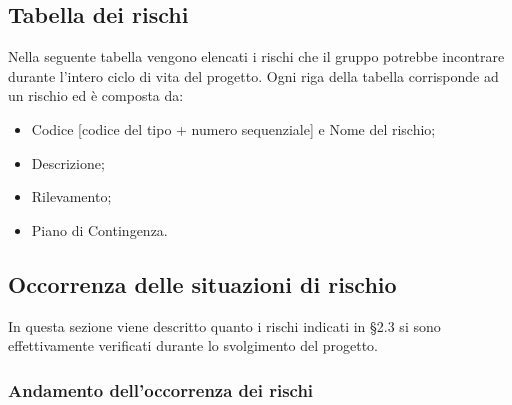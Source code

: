 \subsection{Tabella dei rischi}
Nella seguente tabella vengono elencati i rischi che il gruppo \Gruppo{} potrebbe incontrare durante l'intero ciclo di vita del progetto.
Ogni riga della tabella corrisponde ad un rischio ed è composta da:
\begin{itemize}
	\item Codice [codice del tipo + numero sequenziale] e Nome del rischio;
	\item Descrizione;
	\item Rilevamento;
	\item Piano di Contingenza.
\end{itemize}



\subsection{Occorrenza delle situazioni di rischio}
In questa sezione viene descritto quanto i rischi indicati in §2.3 si sono effettivamente verificati durante lo svolgimento del progetto.








\subsubsection{Andamento dell'occorrenza dei rischi}

